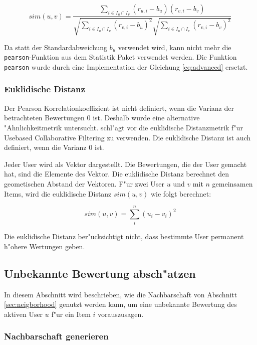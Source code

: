 \documentclass[a4paper, 12pt]{article}
\begin{document}
\begin{equation}
  \label{eq:advanced}
  sim(u,v)  = \frac{\sum_{i \in I_u \cap I_v}(r_{u,i} - b_u)(r_{v,i} - b_v)}{\sqrt{\sum_{i \in I_u \cap I_v}( r_{v,i} - b_u)^2}\sqrt{\sum_{i \in I_u \cap I_v}( r_{v,i} - b_v)^2}}
\end{equation}

Da statt der Standardabweichung $b_u$ verwendet wird, kann nicht mehr die \verb|pearson|-Funktion aus dem Statistik Paket verwendet werden. Die Funktion \verb|pearson| wurde durch eine Implementation der Gleichung \ref{eq:advanced} ersetzt.

\subsubsection{Euklidische Distanz}
\label{sec:euclid}

Der Pearson Korrelationkoeffizient ist nicht definiert, wenn die Varianz der betrachteten Bewertungen 0 ist. Deshalb wurde eine alternative "Ahnlichkeitmetrik untersucht. \cite{segaran} schl"agt vor die euklidische Distanzmetrik f"ur Usebased Collaborative Filtering zu verwenden. Die euklidische Distanz ist auch definiert, wenn die Varianz 0 ist.

Jeder User wird als Vektor dargestellt. Die Bewertungen, die der User gemacht hat, sind die Elemente des Vektor. Die euklidische Distanz berechnet den geometischen Abstand der Vektoren. F"ur zwei User $u$ und $v$ mit $n$ gemeinsamen Items, wird die euklidische Distanz $sim(u,v)$ wie folgt berechnet:

\begin{equation}
  \label{eq:euclid}
 sim(u,v) = \sum_i^n (u_i - v_i )^2
\end{equation}

Die euklidische Distanz ber"ucksichtigt nicht, dass bestimmte User permanent h"ohere Wertungen geben.

\subsection{Unbekannte Bewertung absch"atzen}
\label{sec:compp}

In diesem Abschnitt wird beschrieben, wie die Nachbarschaft von Abschnitt \ref{sec:neigborhood} genutzt werden kann, um eine unbekannte Bewertung des aktiven User $u$ f"ur ein Item $i$ vorauszusagen.

\subsubsection{Nachbarschaft generieren}
\label{sec:generate}
\end{document}
